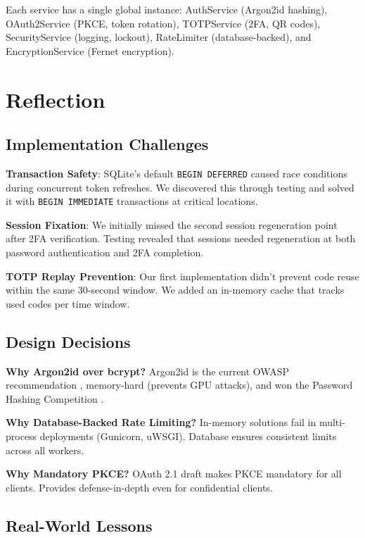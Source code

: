 \documentclass[12pt,a4paper]{article}
\begin{document}
Each service has a single global instance: AuthService (Argon2id hashing), OAuth2Service (PKCE, token rotation), TOTPService (2FA, QR codes), SecurityService (logging, lockout), RateLimiter (database-backed), and EncryptionService (Fernet encryption).

\section{Reflection}

\subsection{Implementation Challenges}

\textbf{Transaction Safety}: SQLite's default \texttt{BEGIN DEFERRED} caused race conditions during concurrent token refreshes. We discovered this through testing and solved it with \texttt{BEGIN IMMEDIATE} transactions at critical locations.

\textbf{Session Fixation}: We initially missed the second session regeneration point after 2FA verification. Testing revealed that sessions needed regeneration at both password authentication and 2FA completion.

\textbf{TOTP Replay Prevention}: Our first implementation didn't prevent code reuse within the same 30-second window. We added an in-memory cache that tracks used codes per time window.

\subsection{Design Decisions}

\textbf{Why Argon2id over bcrypt?} Argon2id is the current OWASP recommendation \cite{owasp_password}, memory-hard (prevents GPU attacks), and won the Password Hashing Competition \cite{biryukov2016}.

\textbf{Why Database-Backed Rate Limiting?} In-memory solutions fail in multi-process deployments (Gunicorn, uWSGI). Database ensures consistent limits across all workers.

\textbf{Why Mandatory PKCE?} OAuth 2.1 draft makes PKCE mandatory for all clients. Provides defense-in-depth even for confidential clients.

\subsection{Real-World Lessons}
\end{document}
